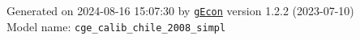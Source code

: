 \documentclass[10pt,a4paper]{article}
\numberwithin{equation}{section}
\begin{document}
\begin{landscape}
\begin{flushleft}{\large
Generated  on 2024-08-16 15:07:30 by \href{http://gecon.r-forge.r-project.org/}{\texttt{gEcon}} version 1.2.2 (2023-07-10)\\
Model name: \verb+cge_calib_chile_2008_simpl+
}\end{flushleft}


\end{landscape}

\end{document}
